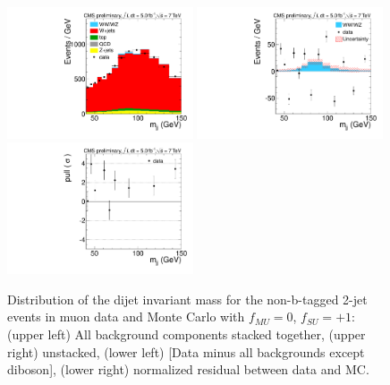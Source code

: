 \begin{figure}[h!]
  {\centering
    \includegraphics[width=0.49\textwidth]{figs/ScaleAndMatchingCrossChecks/mu2JNoBTag_fSUp1fMU0/Wjj_Diboson_Muon_2jets_Stacked.pdf}
    \includegraphics[width=0.49\textwidth]{figs/ScaleAndMatchingCrossChecks/mu2JNoBTag_fSUp1fMU0/Wjj_Diboson_Muon_2jets_Subtracted.pdf}
    \includegraphics[width=0.49\textwidth]{figs/ScaleAndMatchingCrossChecks/mu2JNoBTag_fSUp1fMU0/Wjj_Diboson_Muon_2jets_Pull.pdf}
    \caption{Distribution of the dijet invariant mass for the non-b-tagged 2-jet events in muon data and Monte Carlo with $f_{MU}=0$, $f_{SU}=+1$: 
      (upper left) All background components stacked together, 
      (upper right) unstacked, (lower left) [Data minus all backgrounds except diboson],  
      (lower right) normalized residual between data and MC. }
    \label{fig:fsufmuXcheck_fSUp1fMU0}}
\end{figure}
